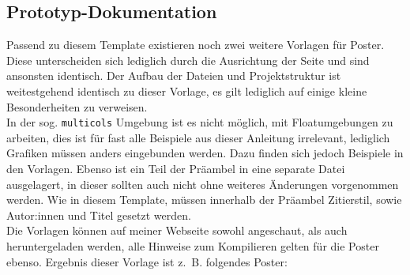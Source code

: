 \subsection{Prototyp-Dokumentation}

Passend zu diesem Template existieren noch zwei weitere Vorlagen für Poster. Diese unterscheiden
sich lediglich durch die Ausrichtung der Seite und sind ansonsten identisch. Der Aufbau der
Dateien und Projektstruktur ist weitestgehend identisch zu dieser Vorlage, es gilt lediglich
auf einige kleine Besonderheiten zu verweisen.\\
In der sog. \texttt{multicols} Umgebung ist es nicht möglich, mit Floatumgebungen zu arbeiten,
dies ist für fast alle Beispiele aus dieser Anleitung irrelevant, lediglich Grafiken müssen
anders eingebunden werden. Dazu finden sich jedoch Beispiele in den Vorlagen. Ebenso ist ein
Teil der Präambel in eine separate Datei ausgelagert, in dieser sollten auch nicht ohne weiteres
Änderungen vorgenommen werden. Wie in diesem Template, müssen innerhalb der Präambel Zitierstil,
sowie Autor:innen und Titel gesetzt werden.\\
Die Vorlagen können auf meiner Webseite sowohl angeschaut, als auch heruntergeladen werden, alle
Hinweise zum Kompilieren gelten für die Poster ebenso. Ergebnis dieser Vorlage ist z. B. folgendes
Poster:

